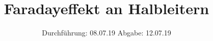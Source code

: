 

\subject{V46}
\title{Faradayeffekt an Halbleitern}
\date{
  Durchführung: 08.07.19
  \hspace{3em}
  Abgabe: 12.07.19
}



\maketitle
\thispagestyle{empty}
\tableofcontents
\newpage




%



\newpage
\printbibliography



